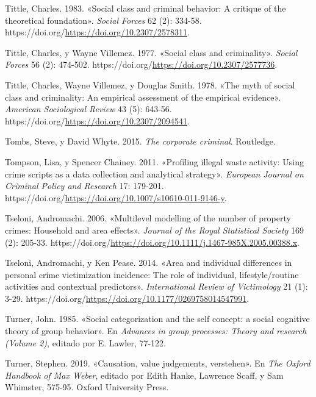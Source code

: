 \documentclass[
  spanish,
  letterpaper,
  DIV=11,
  numbers=noendperiod]{scrreprt}
\newlength{\cslhangindent}
\newenvironment{CSLReferences}[2] %
 {\begin{list}{}{%
  \setlength{\itemindent}{0pt}
  \setlength{\leftmargin}{0pt}
  \setlength{\parsep}{0pt}
  \ifodd #1
   \setlength{\leftmargin}{\cslhangindent}
   \setlength{\itemindent}{-1\cslhangindent}
  \fi
  \setlength{\itemsep}{#2\baselineskip}}}
 {\end{list}}
\begin{document}
\begin{CSLReferences}{1}{0}
Tittle, Charles. 1983. {«Social class and criminal behavior: A critique
of the theoretical foundation»}. \emph{Social Forces} 62 (2): 334-58.
https://doi.org/\url{https://doi.org/10.2307/2578311}.

Tittle, Charles, y Wayne Villemez. 1977. {«Social class and
criminality»}. \emph{Social Forces} 56 (2): 474-502.
https://doi.org/\url{https://doi.org/10.2307/2577736}.

Tittle, Charles, Wayne Villemez, y Douglas Smith. 1978. {«The myth of
social class and criminality: An empirical assessment of the empirical
evidence»}. \emph{American Sociological Review} 43 (5): 643-56.
https://doi.org/\url{https://doi.org/10.2307/2094541}.

Tombs, Steve, y David Whyte. 2015. \emph{The corporate criminal}.
Routledge.

Tompson, Lisa, y Spencer Chainey. 2011. {«Profiling illegal waste
activity: Using crime scripts as a data collection and analytical
strategy»}. \emph{European Journal on Criminal Policy and Research} 17:
179-201.
https://doi.org/\url{https://doi.org/10.1007/s10610-011-9146-y}.

Tseloni, Andromachi. 2006. {«Multilevel modelling of the number of
property crimes: Household and area effects»}. \emph{Journal of the
Royal Statistical Society} 169 (2): 205-33.
https://doi.org/\url{https://doi.org/10.1111/j.1467-985X.2005.00388.x}.

Tseloni, Andromachi, y Ken Pease. 2014. {«Area and individual
differences in personal crime victimization incidence: The role of
individual, lifestyle/routine activities and contextual predictors»}.
\emph{International Review of Victimology} 21 (1): 3-29.
https://doi.org/\url{https://doi.org/10.1177/0269758014547991}.

Turner, John. 1985. {«Social categorization and the self concept: a
social cognitive theory of group behavior»}. En \emph{Advances in group
processes: Theory and research (Volume 2)}, editado por E. Lawler,
77-122.

Turner, Stephen. 2019. {«Causation, value judgements, verstehen»}. En
\emph{The Oxford Handbook of Max Weber}, editado por Edith Hanke,
Lawrence Scaff, y Sam Whimster, 575-95. Oxford University Press.


\end{CSLReferences}
\end{document}
